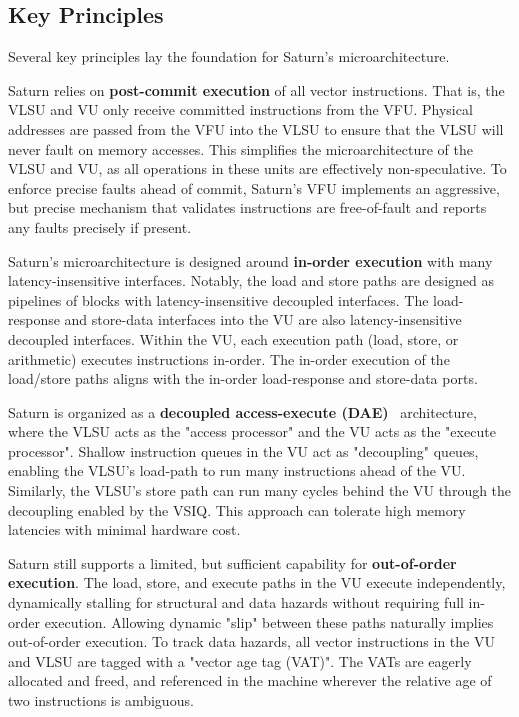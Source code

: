 \subsection{Key Principles}

Several key principles lay the foundation for Saturn's microarchitecture.

Saturn relies on \textbf{post-commit execution} of all vector instructions.
That is, the VLSU and VU only receive committed instructions from the VFU.
Physical addresses are passed from the VFU into the VLSU to ensure that the VLSU will never fault on memory accesses.
This simplifies the microarchitecture of the VLSU and VU, as all operations in these units are effectively non-speculative.
To enforce precise faults ahead of commit, Saturn's VFU implements an aggressive, but precise mechanism that validates instructions are free-of-fault and reports any faults precisely if present.

Saturn's microarchitecture is designed around \textbf{in-order execution} with many latency-insensitive interfaces.
Notably, the load and store paths are designed as pipelines of blocks with latency-insensitive decoupled interfaces.
The load-response and store-data interfaces into the VU are also latency-insensitive decoupled interfaces.
Within the VU, each execution path (load, store, or arithmetic) executes instructions in-order.
The in-order execution of the load/store paths aligns with the in-order load-response and store-data ports.

Saturn is organized as a \textbf{decoupled access-execute (DAE)}~\cite{decoupled_execute} architecture, where the VLSU acts as the "access processor" and the VU acts as the "execute processor".
Shallow instruction queues in the VU act as "decoupling" queues, enabling the VLSU's load-path to run many instructions ahead of the VU.
Similarly, the VLSU's store path can run many cycles behind the VU through the decoupling enabled by the VSIQ.
This approach can tolerate high memory latencies with minimal hardware cost.

Saturn still supports a limited, but sufficient capability for \textbf{out-of-order execution}.
The load, store, and execute paths in the VU execute independently, dynamically stalling for structural and data hazards without requiring full in-order execution.
Allowing dynamic "slip" between these paths naturally implies out-of-order execution.
To track data hazards, all vector instructions in the VU and VLSU are tagged with a "vector age tag (VAT)".
The VATs are eagerly allocated and freed, and referenced in the machine wherever the relative age of two instructions is ambiguous.

